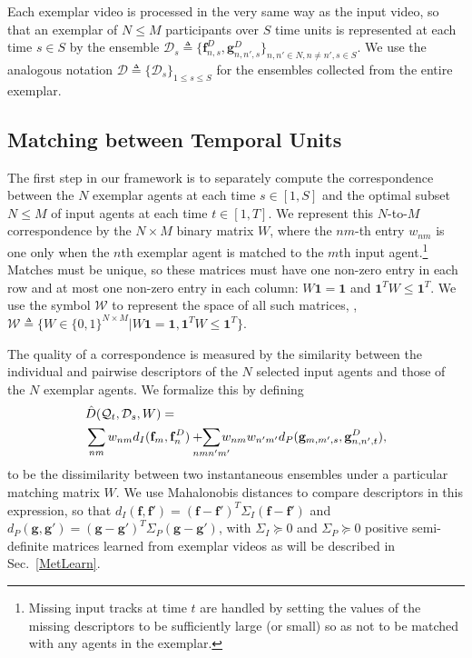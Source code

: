 Each exemplar video is processed in the very same way as the input video, so that an exemplar of $N\le M$ participants over $S$ time units is represented at each time $s\in S$ by the ensemble $\mathcal{D}_{s}\triangleq\{\mathbf{f}^{D}_{n,s},\mathbf{g}^{D}_{n,n',s}\}_{n,n'\in N, n\neq n', s\in S}$. We use the analogous notation $\mathcal{D}\triangleq\{\mathcal{D}_{s}\}_{1\leq s\leq S}$ for the ensembles collected from the entire exemplar. 

\vspace{-5pt}
\subsection{Matching between Temporal Units}

\label{agg}
\vspace{-5pt}

The first step in our framework is to separately compute the correspondence between the $N$ exemplar agents at each time $s\in[1, S]$ and the optimal subset $N\le M$ of input agents at each time $t\in[1, T]$. We represent this $N$-to-$M$ correspondence by the $N\times M$ binary matrix $W$, where the $nm$-th entry $w_{nm}$ is one only when the $n$th exemplar agent is matched to the $m$th input agent.\footnote{Missing input tracks at time $t$ are handled by setting the values of the missing descriptors to be sufficiently large (or small) so as not to be matched with any agents in the exemplar.} Matches must be unique, so these matrices must have one non-zero entry in each row and at most one non-zero entry in each column: $W\mathbf{1}=\mathbf{1}$ and $\mathbf{1}^{T}W\leq\mathbf{1}^{T}$. We use the symbol $\mathcal{W}$ to represent the space of all such matrices, \ie, $\mathcal{W}\triangleq\{W\in\{0,1\}^{N\times M}| W\mathbf{1}=\mathbf{1}, \mathbf{1}^{T}W\leq\mathbf{1}^{T}\}$.

The quality of a correspondence is measured by the similarity between the individual and pairwise descriptors of the $N$ selected input agents and those of the $N$ exemplar agents. We formalize this by defining 
\begin{equation}
\vspace{-10pt}
\begin{split}
&\hat{D}(\mathcal{Q}_{t}, \mathcal{D}_{s}, W)=\\
&\sum_{nm}w_{nm}d_{I}(\mathbf{f}_{m}, \mathbf{f}^{D}_{n})+\!\!\!\!\!\!\sum_{nmn'm'}\!\!\!\!\!w_{nm}w_{n'm'}d_{P}(\mathbf{g}_{m,m',s}, \mathbf{g}^{D}_{n,n',t}),
\end{split}
\vspace{-10pt}
\end{equation}
to be the dissimilarity between two instantaneous ensembles under a particular matching matrix $W$. We use Mahalonobis distances to compare descriptors in this expression, so that $d_{I}(\mathbf{f}, \mathbf{f}')=(\mathbf{f}-\mathbf{f}')^{T}\Sigma_{I}(\mathbf{f}-\mathbf{f}')$ and $d_{P}(\mathbf{g}, \mathbf{g}')=(\mathbf{g}-\mathbf{g}')^{T}\Sigma_{P}(\mathbf{g}-\mathbf{g}')$, with $\Sigma_{I}\succeq 0$ and $\Sigma_{P}\succeq 0$ positive semi-definite matrices learned from exemplar videos as will be described in Sec.~\ref{MetLearn}.


